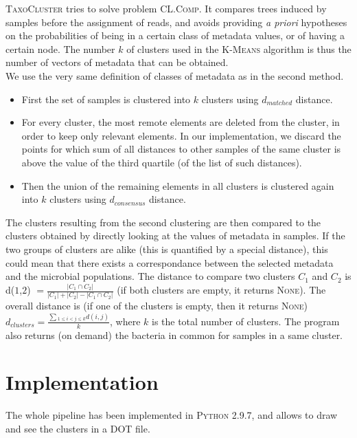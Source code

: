 \documentclass{report}
\begin{document}
\textsc{TaxoCluster} tries to solve problem \textsc{CL.Comp}. It compares trees induced by samples before the assignment of reads, and avoids providing \emph{a priori} hypotheses on the probabilities of being in a certain class of metadata values, or of having a certain node. The number $k$ of clusters used in the \textsc{K-Means} algorithm is thus the number of vectors of metadata that can be obtained.\\

We use the very same definition of classes of metadata as in the second method.

\begin{itemize}
\item First the set of samples is clustered into $k$ clusters using $d_{matched}$ distance. 
\item For every cluster, the most remote elements are deleted from the cluster, in order to keep only relevant elements. In our implementation, we discard the points for which sum of all distances to other samples of the same cluster is above the value of the third quartile (of the list of such distances).
\item Then the union of the remaining elements in all clusters is clustered again into $k$ clusters using $d_{consensus}$ distance.
\end{itemize}

The clusters resulting from the second clustering are then compared to the clusters obtained by directly looking at the values of metadata in samples. If the two groups of clusters are alike (this is quantified by a special distance), this could mean that there exists a correspondance between the selected metadata and the microbial populations. The distance to compare two clusters \textsc{$C_{1}$} and \textsc{$C_{2}$} is d($1$,$2$) $= \frac{|C_{1} \cap C_{2}|}{|C_{1}| + |C_{2}| - |C_{1} \cap C_{2}|} $ (if both clusters are empty, it returns \textsc{None}). The overall distance is (if one of the clusters is empty, then it returns \textsc{None}) $d_{clusters} = \frac{\sum{_{1 \le i < j \le k}}{d(i,j)}}{k}$, where $k$ is the total number of clusters. The program also returns (on demand) the bacteria in common for samples in a same cluster.\\

\section{Implementation}

The whole pipeline has been implemented in \textsc{Python 2.9.7}, and allows to draw and see the clusters in a DOT file.\\
\end{document}

